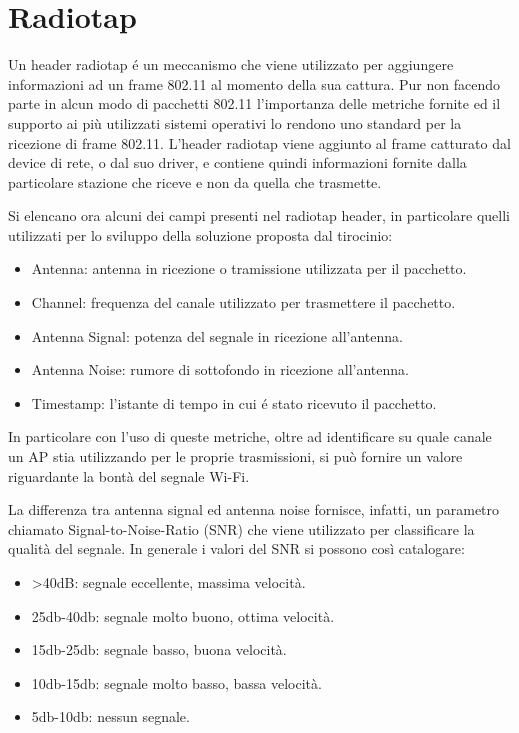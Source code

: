 \section{Radiotap}

Un header radiotap \'e un meccanismo che viene utilizzato per aggiungere informazioni ad un frame 802.11 al momento della sua cattura.
Pur non facendo parte in alcun modo di pacchetti 802.11 l'importanza delle metriche fornite ed il supporto ai pi\`u utilizzati sistemi operativi lo rendono 
uno standard per la ricezione di frame 802.11.
L'header radiotap viene aggiunto al frame catturato dal device di rete, o dal suo driver, e contiene quindi informazioni fornite dalla particolare stazione che riceve e non da quella che trasmette.

Si elencano ora alcuni dei campi presenti nel radiotap header, in particolare quelli utilizzati per lo sviluppo della soluzione proposta dal tirocinio:

\begin{itemize}
	\item Antenna: antenna in ricezione o tramissione utilizzata per il pacchetto.
	\item Channel: frequenza del canale utilizzato per trasmettere il pacchetto.
	\item Antenna Signal: potenza del segnale in ricezione all'antenna.
	\item Antenna Noise: rumore di sottofondo in ricezione all'antenna.
	\item Timestamp: l'istante di tempo in cui \'e stato ricevuto il pacchetto.
\end{itemize}

In particolare con l'uso di queste metriche, oltre ad identificare su quale canale un AP stia utilizzando per le proprie trasmissioni, si pu\`o fornire un valore riguardante la bont\`a del segnale Wi-Fi.

La differenza tra antenna signal ed antenna noise fornisce, infatti, un parametro chiamato Signal-to-Noise-Ratio (SNR) che viene utilizzato per classificare la qualit\`a del segnale.
In generale i valori del SNR si possono cos\`i catalogare:

\begin{itemize}
	\item >40dB: segnale eccellente, massima velocit\`a.
	\item 25db-40db: segnale molto buono, ottima velocit\`a.
	\item 15db-25db: segnale basso, buona velocit\`a.
	\item 10db-15db: segnale molto basso, bassa velocit\`a.
	\item 5db-10db: nessun segnale.
\end{itemize}

